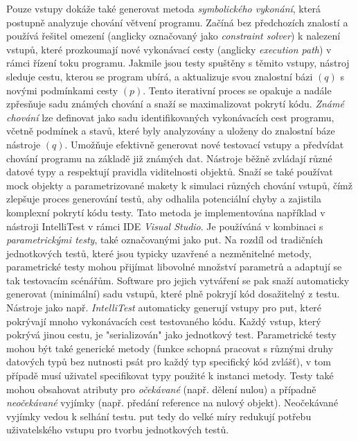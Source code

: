 \documentclass[czech, ma, kiv, he, iso690numb, pdf, viewonly]{fasthesis}
\begin{document}
        Pouze vstupy dokáže také generovat metoda \textit{symbolického vykonání}, která postupně analyzuje chování větvení programu. Začíná bez předchozích znalostí a používá řešitel omezení (anglicky označovaný jako \textit{constraint solver}) k nalezení vstupů, které prozkoumají nové vykonávací cesty (anglicky \textit{execution path}) v rámci řízení toku programu. Jakmile jsou testy spuštěny s těmito vstupy, nástroj sleduje cestu, kterou se program ubírá, a aktualizuje svou znalostní bázi \((q)\) s novými podmínkami cesty \((p)\). Tento iterativní proces se opakuje a nadále zpřesňuje sadu známých chování a snaží se maximalizovat pokrytí kódu. \textit{Známé chování} lze definovat jako sadu identifikovaných vykonávacích cest programu, včetně podmínek a stavů, které byly analyzovány a uloženy do znalostní báze nástroje \((q)\). Umožňuje efektivně generovat nové testovací vstupy a předvídat chování programu na základě již známých dat. Nástroje běžně zvládají různé datové typy a respektují pravidla viditelnosti objektů. Snaží se také používat mock objekty a parametrizované makety k simulaci různých chování vstupů, čímž zlepšuje proces generování testů, aby odhalila potenciální chyby a zajistila komplexní pokrytí kódu testy. \cite{parizek_symbolic_execution} Tato metoda je implementována například v nástroji IntelliTest v rámci IDE \textit{Visual Studio}. Je používáná v kombinaci s \emph{parametrickými testy}, také označovanými jako \acrshort{put}. Na rozdíl od tradičních jednotkových testů, které jsou typicky uzavřené a nezměnitelné metody, parametrické testy mohou přijímat libovolné množství parametrů a adaptují se tak testovacím scénářům. Software pro jejich vytváření se pak snaží automaticky generovat (minimální) sadu vstupů, které plně pokryjí kód dosažitelný z testu. Nástroje jako např. \textit{IntelliTest} automaticky generují vstupy pro \acrshort{put}, které pokrývají mnoho vykonávacích cest testovaného kódu. Každý vstup, který pokrývá jinou cestu, je "serializován" jako jednotkový test. Parametrické testy mohou být také generické metody (funkce schopná pracovat s různými druhy datových typů bez nutnosti psát pro každý typ specifický kód zvlášť), v tom případě musí uživatel specifikovat typy použité k instanci metody. Testy také mohou obsahovat atributy pro \emph{očekávané} (např. dělení nulou) a případně \emph{neočekávané} vyjímky (např. předání reference na nulový objekt). Neočekávané vyjímky vedou k selhání testu. \acrshort{put} tedy do velké míry redukují potřebu uživatelského vstupu pro tvorbu jednotkových testů. \cite{IntelliTestInputGeneration2023} \cite{microsoft2023testgen}
\end{document}
